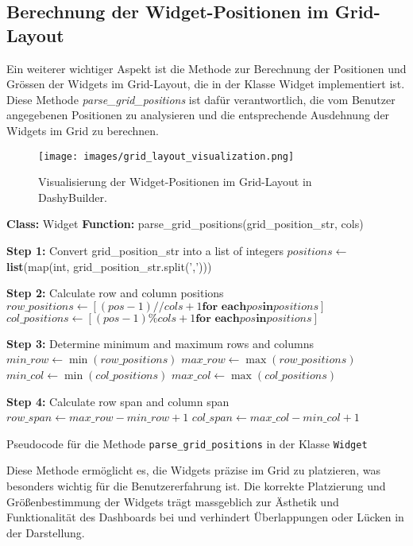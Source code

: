 \documentclass[a4paper, 12pt]{scrartcl}
\begin{document}
\subsection{Berechnung der Widget-Positionen im Grid-Layout}
Ein weiterer wichtiger Aspekt ist die Methode zur Berechnung der Positionen und Grössen der Widgets im Grid-Layout, die in der Klasse Widget implementiert ist. Diese Methode \textit{parse\_grid\_positions} ist dafür verantwortlich, die vom Benutzer angegebenen Positionen zu analysieren und die entsprechende Ausdehnung der Widgets im Grid zu berechnen.
\begin{figure}[H]
    \centering
    \texttt{[image: images/grid\_layout\_visualization.png]}
    \caption{Visualisierung der Widget-Positionen im Grid-Layout in DashyBuilder.}
    \label{fig:grid_layout_visualization}
\end{figure}
\begin{algorithm}[H]
\SetAlgoLined

\textbf{Class:} Widget \;
\textbf{Function:} parse\_grid\_positions(grid\_position\_str, cols) \;

\textbf{Step 1:} Convert grid\_position\_str into a list of integers \;
$positions \gets$ \textbf{list}(map(int, grid\_position\_str.split(',')))\;

\textbf{Step 2:} Calculate row and column positions \;
$row\_positions \gets [(pos - 1) // cols + 1 \textbf{for each} pos \textbf{in} positions]$\;
$col\_positions \gets [(pos - 1) \% cols + 1 \textbf{for each} pos \textbf{in} positions]$\;

\textbf{Step 3:} Determine minimum and maximum rows and columns \;
$min\_row \gets \min(row\_positions)$\;
$max\_row \gets \max(row\_positions)$\;
$min\_col \gets \min(col\_positions)$\;
$max\_col \gets \max(col\_positions)$\;

\textbf{Step 4:} Calculate row span and column span \;
$row\_span \gets max\_row - min\_row + 1$\;
$col\_span \gets max\_col - min\_col + 1$\;


\caption{Pseudocode für die Methode \texttt{parse\_grid\_positions} in der Klasse \texttt{Widget}}
\end{algorithm}

Diese Methode ermöglicht es, die Widgets präzise im Grid zu platzieren, was besonders wichtig für die Benutzererfahrung ist. Die korrekte Platzierung und Größenbestimmung der Widgets trägt massgeblich zur Ästhetik und Funktionalität des Dashboards bei und verhindert Überlappungen oder Lücken in der Darstellung.
\end{document}
